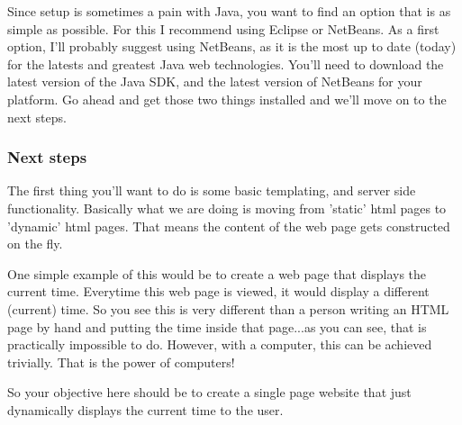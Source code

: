 Since setup is sometimes a pain with Java, you want to find an option that is as simple as possible.  For this I recommend using Eclipse or NetBeans.  As a first option, I'll probably suggest using NetBeans, as it is the most up to date (today) for the latests and greatest Java web technologies.  You'll need to download the latest version of the Java SDK, and the latest version of NetBeans for your platform.  Go ahead and get those two things installed and we'll move on to the next steps.

\subsubsection{Next steps}

The first thing you'll want to do is some basic templating, and server side functionality.  Basically what we are doing is moving from 'static' html pages to 'dynamic' html pages.  That means the content of the web page gets constructed on the fly.  

One simple example of this would be to create a web page that displays the current time.  Everytime this web page is viewed, it would display a different (current) time.  So you see this is very different than a person writing an HTML page by hand and putting the time inside that page...as you can see, that is practically impossible to do.  However, with a computer, this can be achieved trivially.  That is the power of computers!

So your objective here should be to create a single page website that just dynamically displays the current time to the user.






